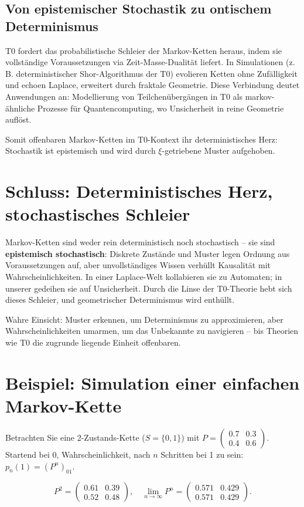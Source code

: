 \documentclass[12pt,a4paper]{article}
\begin{document}
	\subsection{Von epistemischer Stochastik zu ontischem Determinismus}
	T0 fordert das probabilistische Schleier der Markov-Ketten heraus, indem sie vollständige Voraussetzungen via Zeit-Masse-Dualität liefert. In Simulationen (z. B. deterministischer Shor-Algorithmus der T0) evolieren Ketten ohne Zufälligkeit und echoen Laplace, erweitert durch fraktale Geometrie. Diese Verbindung deutet Anwendungen an: Modellierung von Teilchenübergängen in T0 als markov-ähnliche Prozesse für Quantencomputing, wo Unsicherheit in reine Geometrie auflöst.
	
	Somit offenbaren Markov-Ketten im T0-Kontext ihr deterministisches Herz: Stochastik ist epistemisch und wird durch $\xi$-getriebene Muster aufgehoben.
	
	\section{Schluss: Deterministisches Herz, stochastisches Schleier}
	
	Markov-Ketten sind weder rein deterministisch noch stochastisch – sie sind \textbf{epistemisch stochastisch}: Diskrete Zustände und Muster legen Ordnung aus Voraussetzungen auf, aber unvollständiges Wissen verhüllt Kausalität mit Wahrscheinlichkeiten. In einer Laplace-Welt kollabieren sie zu Automaten; in unserer gedeihen sie auf Unsicherheit. Durch die Linse der T0-Theorie hebt sich dieses Schleier, und geometrischer Determinismus wird enthüllt.
	
	Wahre Einsicht: Muster erkennen, um Determinismus zu approximieren, aber Wahrscheinlichkeiten umarmen, um das Unbekannte zu navigieren – bis Theorien wie T0 die zugrunde liegende Einheit offenbaren.
	
	\appendix
	\section{Beispiel: Simulation einer einfachen Markov-Kette}
	
	Betrachten Sie eine 2-Zustands-Kette ($S = \{0,1\}$) mit $P = \begin{pmatrix} 0.7 & 0.3 \\ 0.4 & 0.6 \end{pmatrix}$. Startend bei 0, Wahrscheinlichkeit, nach $n$ Schritten bei 1 zu sein: $p_n(1) = (P^n)_{01}$.
	
	\begin{equation}
		P^2 = \begin{pmatrix} 0.61 & 0.39 \\ 0.52 & 0.48 \end{pmatrix}, \quad \lim_{n\to\infty} P^n = \begin{pmatrix} 0.571 & 0.429 \\ 0.571 & 0.429 \end{pmatrix}.
	\end{equation}
	
\end{document}
